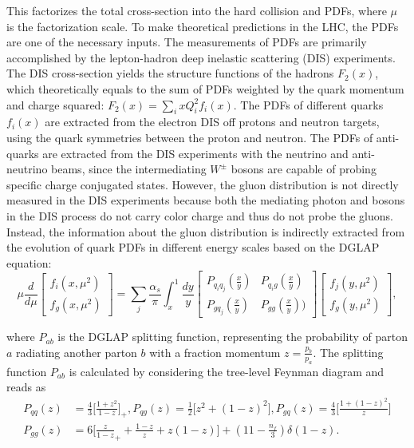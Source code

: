 \noindent This factorizes the total cross-section into the hard collision and PDFs, where $\mu$ is the factorization scale. To make theoretical predictions in the LHC, the PDFs are one of the necessary inputs. The measurements of PDFs are primarily accomplished by the lepton-hadron deep inelastic scattering (DIS) experiments. The DIS cross-section yields the structure functions of the hadrons $F_2(x)$, which theoretically equals to the sum of PDFs weighted by the quark momentum and charge squared: $F_2(x) = \sum_i x Q^2_i f_i(x)$. The PDFs of different quarks $f_i(x)$ are extracted from the electron DIS off protons and neutron targets, using the quark symmetries between the proton and neutron. The PDFs of anti-quarks are extracted from the DIS experiments with the neutrino and anti-neutrino beams, since the intermediating $W^\pm$ bosons are capable of probing specific charge conjugated states. However, the gluon distribution is not directly measured in the DIS experiments because both the mediating photon and \PW bosons in the DIS process do not carry color charge and thus do not probe the gluons. Instead, the information about the gluon distribution is indirectly extracted from the evolution of quark PDFs in different energy scales based on the DGLAP equation:
\begin{equation}
    \mu \frac{d}{d\mu} \begin{bmatrix} f_i(x,\mu^2) \\ f_g(x,\mu^2) \end{bmatrix} = 
    \sum_j \frac{\alpha_s}{\pi} \int_x^1 
    \frac{dy}{y}
    \begin{bmatrix} P_{q_i q_j}(\frac{x}{y}) & P_{q_i g}(\frac{x}{y}) \\ P_{g q_j}(\frac{x}{y}) & P_{gg}(\frac{x}{y})) \end{bmatrix} \begin{bmatrix} f_j(y,\mu^2) \\ f_g(y, \mu^2) \end{bmatrix} ,
    \label{eqn:physics:qft:ppCollision:dglap}
\end{equation}

\noindent where $P_{ab}$ is the DGLAP splitting function, representing the probability of parton $a$ radiating another parton $b$ with a fraction momentum $z=\frac{p_b}{p_a}$. The splitting  function $P_{ab}$ is calculated by considering the tree-level Feynman diagram and reads as
\begin{equation}
\begin{split}
	P_{qq}(z) &= \frac{4}{3}\bigg[\frac{1+z^2}{1-z} \bigg]_+, P_{qg}(z)=\frac{1}{2} \bigg[z^2+(1-z)^2 \bigg], P_{gq}(z)=\frac{4}{3}\bigg[\frac{1+(1-z)^2}{z} \bigg]\\
    P_{gg}(z) &= 6 \bigg[ \frac{z}{1-z}_+ + \frac{1-z}{z} + z(1-z) \bigg] +(11-\frac{n_f}{3})\delta(1-z) .
\end{split}
\label{eqn:physics:qft:ppCollision:splitting}
\end{equation}

